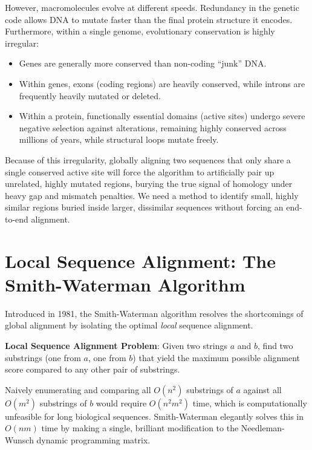 However, macromolecules evolve at different speeds. Redundancy in the genetic code allows DNA to mutate faster than the final protein structure it encodes. Furthermore, within a single genome, evolutionary conservation is highly irregular:
\begin{itemize}
    \item Genes are generally more conserved than non-coding ``junk'' DNA.
    \item Within genes, exons (coding regions) are heavily conserved, while introns are frequently heavily mutated or deleted.
    \item Within a protein, functionally essential domains (active sites) undergo severe negative selection against alterations, remaining highly conserved across millions of years, while structural loops mutate freely.
\end{itemize}

Because of this irregularity, globally aligning two sequences that only share a single conserved active site will force the algorithm to artificially pair up unrelated, highly mutated regions, burying the true signal of homology under heavy gap and mismatch penalties. \sta We need a method to identify small, highly similar regions buried inside larger, dissimilar sequences without forcing an end-to-end alignment.

\section{Local Sequence Alignment: The Smith-Waterman Algorithm}

Introduced in 1981, the Smith-Waterman algorithm resolves the shortcomings of global alignment by isolating the optimal \textit{local} sequence alignment. 

\begin{important}
    \textbf{Local Sequence Alignment Problem}: Given two strings $a$ and $b$, find two substrings (one from $a$, one from $b$) that yield the maximum possible alignment score compared to any other pair of substrings.
\end{important}

Naively enumerating and comparing all $O(n^2)$ substrings of $a$ against all $O(m^2)$ substrings of $b$ would require $O(n^2 m^2)$ time, which is computationally unfeasible for long biological sequences. Smith-Waterman elegantly solves this in $O(nm)$ time by making a single, brilliant modification to the Needleman-Wunsch dynamic programming matrix.

